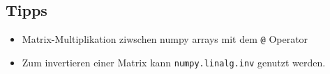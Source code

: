\documentclass{scrartcl}
\begin{document}
\subsection*{Tipps}

\begin{itemize}
  \item Matrix-Multiplikation ziwschen numpy arrays mit dem \texttt{@} Operator
  \item Zum invertieren einer Matrix kann \texttt{numpy.linalg.inv} genutzt werden.
\end{itemize}
\end{document}
